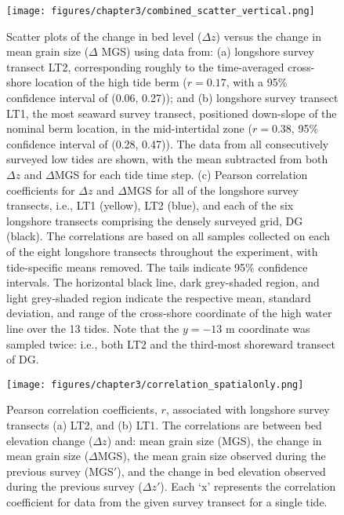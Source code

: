 \documentclass[jmse,article,submit,pdftex,moreauthors]{Definitions/mdpi}
\begin{document}
\begin{figure}[tbp] %
	\begin{center}
		\texttt{[image: figures/chapter3/combined\_scatter\_vertical.png]}
		\caption[Cross-shore dependence of correlations between bed level and mean grain size change]{Scatter plots of the change in bed level ($\Delta z$) versus the change in mean grain size ($\Delta$ MGS) using data from: (a) longshore survey transect LT2, corresponding roughly to the time-averaged cross-shore location of the high tide berm ($r=0.17$, with a 95\% confidence interval of (0.06, 0.27)); and (b) longshore survey transect LT1, the most seaward survey transect, positioned down-slope of the nominal berm location, in the mid-intertidal zone ($r=0.38$, 95\% confidence interval of (0.28, 0.47)). The data from all consecutively surveyed low tides are shown, with the mean subtracted from both $\Delta z$ and $\Delta$MGS for each tide time step. (c) Pearson correlation coefficients for $\Delta z$ and $\Delta$MGS for all of the longshore survey transects, i.e., LT1 (yellow), LT2 (blue), and each of the six longshore transects comprising the densely surveyed grid, DG (black). The correlations are based on all samples collected on each of the eight longshore transects throughout the experiment, with tide-specific means removed. The tails indicate 95\% confidence intervals. The horizontal black line, dark grey-shaded region, and light grey-shaded region indicate the respective mean, standard deviation, and range of the cross-shore coordinate of the high water line over the 13 tides. Note that the $y=-13$ m coordinate was sampled twice: i.e., both LT2 and the third-most shoreward transect of DG.}
		\label{fig:corr_coeffs_spatial}
	\end{center}
\end{figure}

\begin{figure}[tbp] %
	\begin{center}
		\texttt{[image: figures/chapter3/correlation\_spatialonly.png]}
		\caption[Spatial correlation coefficients]{Pearson correlation coefficients, $r$, associated with longshore survey transects (a) LT2, and (b) LT1. The correlations are between bed elevation change ($\Delta z$) and: mean grain size (MGS), the change in mean grain size ($\Delta$MGS), the mean grain size observed during the previous survey (MGS$'$), and the change in bed elevation observed during the previous survey ($\Delta z'$). Each `x' represents the correlation coefficient for data from the given survey transect for a single tide.}
		\label{fig:corr_coeffs_all}
	\end{center}
\end{figure}
\end{document}
